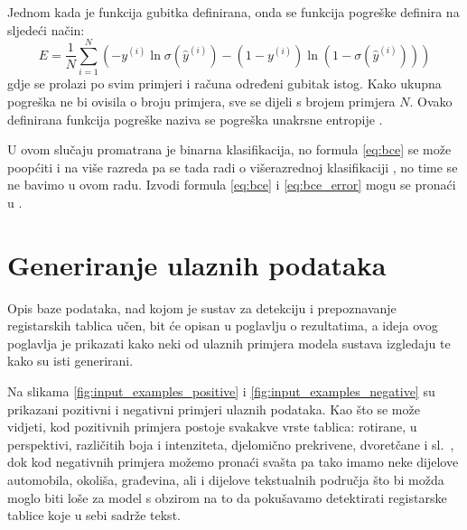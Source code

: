\documentclass[times, utf8, diplomski]{fer}
\begin{document}
Jednom kada je funkcija gubitka definirana, onda se funkcija pogreške definira na sljedeći način:
\begin{equation}
    E = \frac{1}{N}\sum_{i=1}^{N}(-y^{(i)}\ln\sigma(\hat{y}^{(i)}) - (1-y^{(i)})\ln(1-\sigma(\hat{y}^{(i)})))
    \label{eq:bce_error}
\end{equation}
gdje se prolazi po svim primjeri i računa određeni gubitak istog. Kako ukupna pogreška ne bi ovisila o broju primjera, sve se dijeli s brojem primjera $N$. Ovako definirana funkcija pogreške naziva se pogreška unakrsne entropije .

U ovom slučaju promatrana je binarna klasifikacija, no formula \ref{eq:bce} se može poopćiti i na više razreda pa se tada radi o višerazrednoj klasifikaciji , no time se ne bavimo u ovom radu. Izvodi formula \ref{eq:bce} i \ref{eq:bce_error} mogu se pronaći u \citep{snajder}.

\section{Generiranje ulaznih podataka}
Opis baze podataka, nad kojom je sustav za detekciju i prepoznavanje registarskih tablica učen, bit će opisan u poglavlju o rezultatima, a ideja ovog poglavlja je prikazati kako neki od ulaznih primjera modela sustava izgledaju te kako su isti generirani.

Na slikama \ref{fig:input_examples_positive} i \ref{fig:input_examples_negative} su prikazani pozitivni i negativni primjeri ulaznih podataka. Kao što se može vidjeti, kod pozitivnih primjera postoje svakakve vrste tablica: rotirane, u perspektivi, različitih boja i intenziteta, djelomično prekrivene, dvoretčane i sl.\ , dok kod negativnih primjera možemo pronaći svašta pa tako imamo neke dijelove automobila, okoliša, građevina, ali i dijelove tekstualnih područja što bi možda moglo biti loše za model s obzirom na to da pokušavamo detektirati registarske tablice koje u sebi sadrže tekst.
\end{document}
